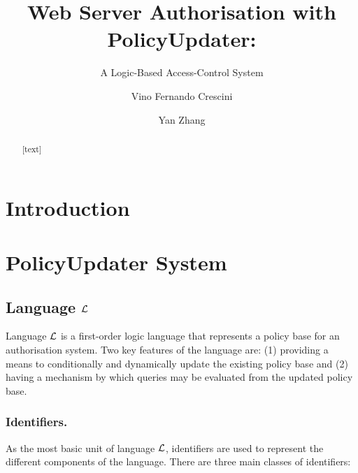\documentclass[11pt]{llncs}
\begin{document}
  \title{Web Server Authorisation with PolicyUpdater:}
  \subtitle{A Logic-Based Access-Control System}

  \author{Vino Fernando Crescini \and Yan Zhang}


  \maketitle

  \begin{abstract}
    [text]
  \end{abstract}

  \section{Introduction}

  \section{PolicyUpdater System}

    \subsection{Language ${\cal L}$}
      Language $\cal{L}$ is a first-order logic language that represents a
      policy base for an authorisation system. Two key features of the
      language are: (1) providing a means to conditionally and dynamically
      update  the existing policy base and (2) having a mechanism by which
      queries may be evaluated from the updated policy base.

      \subsubsection{Identifiers.}

        As the most basic unit of language ${\cal L}$, identifiers are used to
        represent the different components of the language. There are three
        main classes of identifiers:
\end{document}
